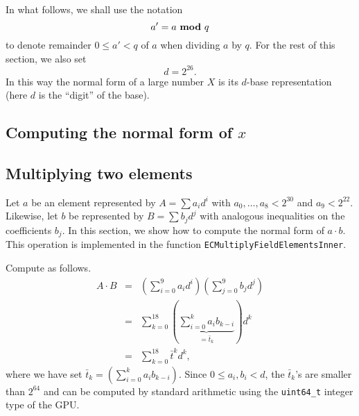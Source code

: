 \documentclass{article}
\renewcommand{\mod}{{~\bf mod~}}
\begin{document}
In what follows, we shall use the notation
\[
a'=a \mod q
\]
to denote remainder $0\leq a' <q$  of $a$ when dividing $a$ by $q$. For the rest of this section, we also set 
\[
d= 2^{26}.
\]
In this way the normal form of a large number $X$ is its $d$-base representation (here $d$ is the ``digit'' of the base).

\subsection{Computing the normal form of $x$}\label{secNormalFormOfFieldElement}

\subsection{Multiplying two elements}
Let $a$ be an element represented by $A = \sum a_i d^i$ with $a_0, \dots, a_8<2^{30}$ and $a_9<2^{22}$. Likewise, let $b$ be represented by $B=\sum b_j d^j$ with analogous inequalities on the coefficients $b_j$. In this section, we show how to compute the normal form of $a\cdot b$. This operation is implemented in the function \verb|ECMultiplyFieldElementsInner|. 

Compute as follows.
\[
\begin{array}{rcl}
\displaystyle A\cdot B &=&\displaystyle \left(\sum_{i=0}^9 a_i d^i \right) \left(\sum_{j=0}^9 b_j d^j\right) \\
&=&\displaystyle  \sum_{k=0}^{18} \left(\underbrace{ \sum_{i=0}^k a_i b_{k-i} }_{=\bar t_k} \right) d^k \\
&=&\displaystyle \sum_{k=0}^{18} \bar t^k d^k,
\end{array}
\]
where we have set $\displaystyle \bar t_k = \left(\sum_{i=0}^k a_i b_{k-i} \right)$. Since $0\leq a_i,b_i < d$, the $\bar t_k$'s are smaller than $2^{64}$ and can be computed by standard arithmetic using the \verb|uint64_t| integer type of the GPU. 
\end{document}
